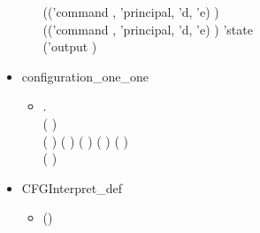\begin{itemize}
\begin{itemize}
        (('command , 'principal, 'd, 'e)  )\\
        (('command , 'principal, 'd, 'e)  ) 'state\\
        ('output )
      \end{itemize}
      \item configuration_one_one
  \begin{itemize}
    \item[] \HOLTokenTurnstile{} \HOLSymConst{\HOLTokenForall{}}           .\\
     (       \HOLSymConst{=}       ) \HOLSymConst{\HOLTokenEquiv{}}\\
     ( \HOLSymConst{=} ) \HOLSymConst{\HOLTokenConj{}} ( \HOLSymConst{=} ) \HOLSymConst{\HOLTokenConj{}} ( \HOLSymConst{=} ) \HOLSymConst{\HOLTokenConj{}} ( \HOLSymConst{=} ) \HOLSymConst{\HOLTokenConj{}} ( \HOLSymConst{=} ) \HOLSymConst{\HOLTokenConj{}}\\
     ( \HOLSymConst{=} )
      \end{itemize}
       \item CFGInterpret_def
  \begin{itemize}
    \item[] \HOLTokenTurnstile{}  (\HOLSymConst{,}\HOLSymConst{,})\\

\end{itemize}
\end{itemize}

